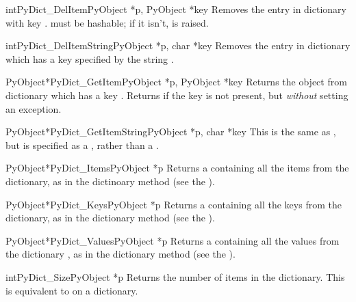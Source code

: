 \documentclass{manual}
\begin{document}
\begin{cfuncdesc}{int}{PyDict_DelItem}{PyObject *p, PyObject *key}
Removes the entry in dictionary  with key .
 must be hashable; if it isn't,  is
raised.
\end{cfuncdesc}

\begin{cfuncdesc}{int}{PyDict_DelItemString}{PyObject *p, char *key}
Removes the entry in dictionary  which has a key
specified by the string .
\end{cfuncdesc}

\begin{cfuncdesc}{PyObject*}{PyDict_GetItem}{PyObject *p, PyObject *key}
Returns the object from dictionary  which has a key
.  Returns \NULL{} if the key  is not present, but
\emph{without} setting an exception.
\end{cfuncdesc}

\begin{cfuncdesc}{PyObject*}{PyDict_GetItemString}{PyObject *p, char *key}
This is the same as , but  is
specified as a , rather than a .
\end{cfuncdesc}

\begin{cfuncdesc}{PyObject*}{PyDict_Items}{PyObject *p}
Returns a  containing all the items 
from the dictionary, as in the dictinoary method  (see
the ).
\end{cfuncdesc}

\begin{cfuncdesc}{PyObject*}{PyDict_Keys}{PyObject *p}
Returns a  containing all the keys 
from the dictionary, as in the dictionary method  (see the
).
\end{cfuncdesc}

\begin{cfuncdesc}{PyObject*}{PyDict_Values}{PyObject *p}
Returns a  containing all the values 
from the dictionary , as in the dictionary method
 (see the ).
\end{cfuncdesc}

\begin{cfuncdesc}{int}{PyDict_Size}{PyObject *p}
Returns the number of items in the dictionary.  This is equivalent to
 on a dictionary.
\end{cfuncdesc}
\end{document}
